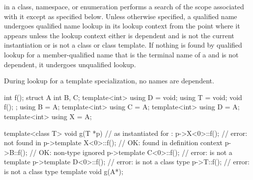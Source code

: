 \pnum
{}
in a class, namespace, or enumeration performs
a search of the scope associated with it
except as specified below.
Unless otherwise specified,
a qualified name undergoes qualified name lookup in its lookup context
from the point where it appears
unless the lookup context either
is dependent and is not the current instantiation or
is not a class or class template.
If nothing is found by qualified lookup for a member-qualified name
that is the terminal name of
a  and
is not dependent, it undergoes unqualified lookup.
\begin{note}
During lookup for a template specialization, no names are dependent.
\end{note}
\begin{example}
\begin{codeblock}
int f();
struct A {
  int B, C;
  template<int> using D = void;
  using T = void;
  void f();
};
using B = A;
template<int> using C = A;
template<int> using D = A;
template<int> using X = A;

template<class T>
void g(T *p) {                  // as instantiated for :
  p->X<0>::f();                 // error:  not found in 
  p->template X<0>::f();        // OK:  found in definition context
  p->B::f();                    // OK: non-type  ignored
  p->template C<0>::f();        // error:  is not a template
  p->template D<0>::f();        // error:  is not a class type
  p->T::f();                    // error:  is not a class type
}
template void g(A*);
\end{codeblock}
\end{example}

